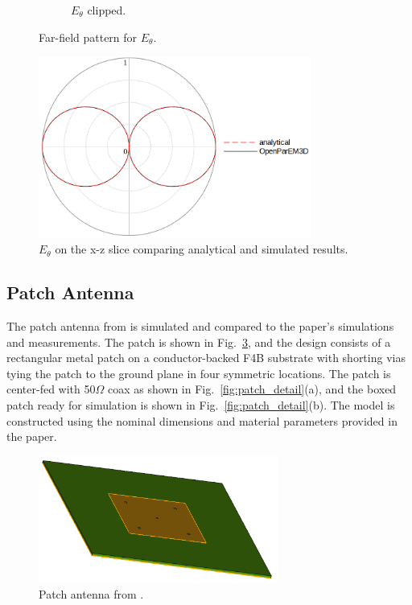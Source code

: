 \documentclass[titlepage]{article}
\renewcommand\_{\textunderscore\linebreak[1]}
\begin{document}
\begin{figure}[H]
\begin{subfigure}[t]{0.33\textwidth}
     \caption{$E_\theta$ clipped.}
  \end{subfigure}
  \caption{Far-field pattern for $E_\theta$.}
  \label{fig:dipole_pattern}
\end{figure}

\begin{figure}[H]
  \centering
  \includegraphics[width=0.8\textwidth]{../regression/OpenParEM3D/antenna/dipole_study/screenshots/dipole_slice}
  \caption{$E_\theta$ on the x-z slice comparing analytical and simulated results.}
  \label{fig:dipole_slice}
\end{figure}

\subsection{Patch Antenna}

The patch antenna from \cite{Mei} is simulated and compared to the paper's simulations and measurements.  The patch is shown in Fig.~\ref{fig:patch}, and the design consists of a rectangular metal patch on a conductor-backed F4B substrate with shorting vias tying the patch to the ground plane in four symmetric locations.  The patch is center-fed with 50$\Omega$ coax as shown in Fig.~\ref{fig:patch_detail}(a), and the boxed patch ready for simulation is shown in Fig.~\ref{fig:patch_detail}(b).  The model is constructed using the nominal dimensions and material parameters provided in the paper.

\begin{figure}[H]
  \centering
  \includegraphics[width=0.7\textwidth]{../regression/OpenParEM3D/antenna/patch_study/screenshots/patch}
  \caption{Patch antenna from \cite{Mei}.}
  \label{fig:patch}
\end{figure}
\end{document}
